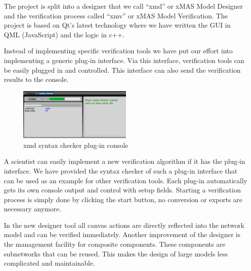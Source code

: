 The project is split into a designer that we call
``xmd'' or xMAS Model Designer and the verification process called ``xmv'' or
xMAS Model Verification. The project is based on Qt's latest technology where we
have written the GUI in QML (JavaScript) and the logic in c++.

Instead of implementing specific verification tools we have put our effort into
implementing a generic plug-in interface. Via this interface, verification tools
can be easily plugged in and controlled. This interface can also send the
verification results to the console.
\begin{figure}
  \vspace{-20pt}
  \begin{center}
    \includegraphics[width=0.50\textwidth]{console}
  \end{center}
  \vspace{-20pt}
  \caption{xmd syntax checker plug-in console}
  \label{fig:console}
  \vspace{-10pt}
\end{figure}
A scientist can easily implement a new verification algorithm if it has the
plug-in interface. We have provided the syntax checker of such a plug-in interface
that can be used as an example for other verification tools. Each plug-in
automatically gets its own console output and control with setup fields.
Starting a verification process is simply done by clicking the start button, no
conversion or exports are necessary anymore.


In the new designer tool all canvas actions are directly reflected into the
network model and can be verified immediately. Another improvement of the
designer is the management facility for composite components. These components
are subnetworks that can be reused. This makes the design of large models less
complicated and maintainable.

